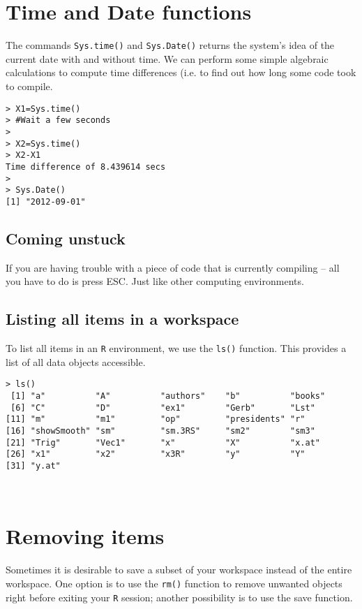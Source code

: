 \documentclass{article}
\begin{document}
\section{Time and Date functions}
The commands \texttt{Sys.time()} and \texttt{Sys.Date()} returns the system's idea of the current date with and without time.
We can perform some simple algebraic calculations to compute time differences (i.e. to find out how long some code took to compile.
\begin{framed}
\begin{verbatim}
> X1=Sys.time()
> #Wait a few seconds
>
> X2=Sys.time()
> X2-X1
Time difference of 8.439614 secs
>
> Sys.Date() 
[1] "2012-09-01"
\end{verbatim}
\end{framed}
\subsection*{Coming unstuck}
If you are having trouble with a piece of code that is currently compiling – all you have to do is press ESC. Just like other computing environments.

\subsection*{Listing all items in a workspace}
To list all items in an \texttt{R} environment, we use the \texttt{ls()} function. This provides a list of all data objects  accessible.
\begin{framed}
\begin{verbatim}
> ls()
 [1] "a"          "A"          "authors"    "b"          "books"     
 [6] "C"          "D"          "ex1"        "Gerb"       "Lst"       
[11] "m"          "m1"         "op"         "presidents" "r"         
[16] "showSmooth" "sm"         "sm.3RS"     "sm2"        "sm3"       
[21] "Trig"       "Vec1"       "x"          "X"          "x.at"      
[26] "x1"         "x2"         "x3R"        "y"          "Y"         
[31] "y.at"      
\end{verbatim}
\end{framed}

 
\section{Removing items}
Sometimes it is desirable to save a subset of your workspace instead of the entire workspace. One option is to use the \texttt{rm()} function to remove unwanted objects right before exiting your \texttt{R} session; another possibility is to use the save function. 
\end{document}
